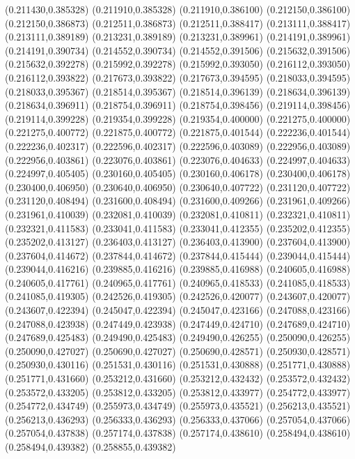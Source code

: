 (0.211430,0.385328)
(0.211910,0.385328)
(0.211910,0.386100)
(0.212150,0.386100)
(0.212150,0.386873)
(0.212511,0.386873)
(0.212511,0.388417)
(0.213111,0.388417)
(0.213111,0.389189)
(0.213231,0.389189)
(0.213231,0.389961)
(0.214191,0.389961)
(0.214191,0.390734)
(0.214552,0.390734)
(0.214552,0.391506)
(0.215632,0.391506)
(0.215632,0.392278)
(0.215992,0.392278)
(0.215992,0.393050)
(0.216112,0.393050)
(0.216112,0.393822)
(0.217673,0.393822)
(0.217673,0.394595)
(0.218033,0.394595)
(0.218033,0.395367)
(0.218514,0.395367)
(0.218514,0.396139)
(0.218634,0.396139)
(0.218634,0.396911)
(0.218754,0.396911)
(0.218754,0.398456)
(0.219114,0.398456)
(0.219114,0.399228)
(0.219354,0.399228)
(0.219354,0.400000)
(0.221275,0.400000)
(0.221275,0.400772)
(0.221875,0.400772)
(0.221875,0.401544)
(0.222236,0.401544)
(0.222236,0.402317)
(0.222596,0.402317)
(0.222596,0.403089)
(0.222956,0.403089)
(0.222956,0.403861)
(0.223076,0.403861)
(0.223076,0.404633)
(0.224997,0.404633)
(0.224997,0.405405)
(0.230160,0.405405)
(0.230160,0.406178)
(0.230400,0.406178)
(0.230400,0.406950)
(0.230640,0.406950)
(0.230640,0.407722)
(0.231120,0.407722)
(0.231120,0.408494)
(0.231600,0.408494)
(0.231600,0.409266)
(0.231961,0.409266)
(0.231961,0.410039)
(0.232081,0.410039)
(0.232081,0.410811)
(0.232321,0.410811)
(0.232321,0.411583)
(0.233041,0.411583)
(0.233041,0.412355)
(0.235202,0.412355)
(0.235202,0.413127)
(0.236403,0.413127)
(0.236403,0.413900)
(0.237604,0.413900)
(0.237604,0.414672)
(0.237844,0.414672)
(0.237844,0.415444)
(0.239044,0.415444)
(0.239044,0.416216)
(0.239885,0.416216)
(0.239885,0.416988)
(0.240605,0.416988)
(0.240605,0.417761)
(0.240965,0.417761)
(0.240965,0.418533)
(0.241085,0.418533)
(0.241085,0.419305)
(0.242526,0.419305)
(0.242526,0.420077)
(0.243607,0.420077)
(0.243607,0.422394)
(0.245047,0.422394)
(0.245047,0.423166)
(0.247088,0.423166)
(0.247088,0.423938)
(0.247449,0.423938)
(0.247449,0.424710)
(0.247689,0.424710)
(0.247689,0.425483)
(0.249490,0.425483)
(0.249490,0.426255)
(0.250090,0.426255)
(0.250090,0.427027)
(0.250690,0.427027)
(0.250690,0.428571)
(0.250930,0.428571)
(0.250930,0.430116)
(0.251531,0.430116)
(0.251531,0.430888)
(0.251771,0.430888)
(0.251771,0.431660)
(0.253212,0.431660)
(0.253212,0.432432)
(0.253572,0.432432)
(0.253572,0.433205)
(0.253812,0.433205)
(0.253812,0.433977)
(0.254772,0.433977)
(0.254772,0.434749)
(0.255973,0.434749)
(0.255973,0.435521)
(0.256213,0.435521)
(0.256213,0.436293)
(0.256333,0.436293)
(0.256333,0.437066)
(0.257054,0.437066)
(0.257054,0.437838)
(0.257174,0.437838)
(0.257174,0.438610)
(0.258494,0.438610)
(0.258494,0.439382)
(0.258855,0.439382)
